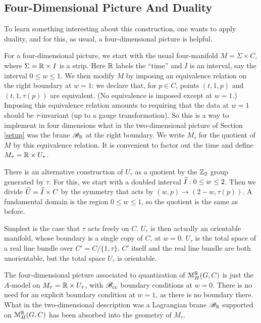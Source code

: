 \documentclass[11pt,a4paper]{article}
\begin{document}
  
\subsection{Four-Dimensional Picture And Duality}\label{fourdpic}

To learn something interesting about this construction, one wants to apply duality, and for this, as usual, a four-dimensional picture is helpful.

For a four-dimensional picture, we start with the usual four-manifold $M=\Sigma\times C$, where $\Sigma={\mathbb{R}}\times I$ is a strip.   Here ${\mathbb{R}}$ labels the ``time''
and $I$ is an interval, say the interval $0\leq w\leq 1$.   We then modify   $M$ by imposing an equivalence relation on the right boundary at $w=1$:
we declare that, for $p\in C$, points $(t,1,p)$ and $(t,1,\tau(p))$ are equivalent. (No equivalence is imposed except at $w=1$.)  
Imposing this equivalence relation amounts to requiring that the data at $w=1$ should be $\tau$-invariant (up to a gauge transformation).  So this
is a way to implement in four dimensions what in the two-dimensional picture of  Section \ref{setup} was the brane ${\mathscr B}_{\mathbb{R}}$ at the right boundary.
We write $M_\tau$ for the quotient of $M$ by this equivalence relation.   It is convenient to factor out the time and define $M_\tau={\mathbb{R}}\times U_\tau$.

There is an alternative construction of $U_\tau$ as a quotient by the ${\mathbb Z}_2$ group generated by $\tau$.  For this, we start with a doubled interval
$\widehat I: 0\leq w\leq 2$.   Then we divide $\widehat U= \widehat I\times C$ by the symmetry that acts by $(w,p)\to (2-w,\tau(p))$.   A fundamental domain is the region
$0\leq w\leq 1$, so the quotient is the same as before.  

Simplest is the case that $\tau$ acts freely on $C$.   $U_\tau$ is then actually an orientable manifold,
whose boundary is a single copy of $C$, at $w=0$.  $U_\tau$ is the total space of a real line bundle over $C'=C/\{1,\tau\}$.
$C'$ itself and the real line bundle are both unorientable, but the total space $U_\tau$ is orientable.   

The four-dimensional picture associated to quantization of ${\mathcal M}_H^{\mathbb{R}}(G,C)$ is just the $A$-model on $M_\tau={\mathbb{R}}\times U_\tau$, with ${\mathscr B}_{\mathrm{cc}}$ boundary
conditions  at $w=0$.   There is no need for an explicit boundary condition at $w=1$, as there is no boundary there.  
What in the two-dimensional description was a Lagrangian brane ${\mathscr B}_{\mathbb{R}}$ supported on ${\mathcal M}_H^{\mathbb{R}}(G,C)$ has been absorbed into the geometry of $M_\tau$.
\end{document}
